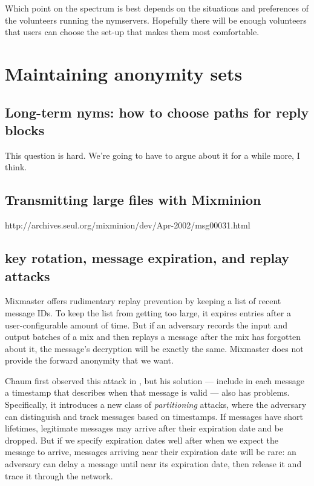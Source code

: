 \documentclass{llncs}
\begin{document}
{Which point on the spectrum is best depends on the situations and
preferences of the volunteers running the nymservers. Hopefully there
will be enough volunteers that users can choose the set-up that makes
them most comfortable.


\section{Maintaining anonymity sets}

\subsection{Long-term nyms: how to choose paths for reply blocks}

This question is hard. We're going to have to argue about it for a
while more, I think.

\subsection{Transmitting large files with Mixminion}

http://archives.seul.org/mixminion/dev/Apr-2002/msg00031.html

\subsection{key rotation, message expiration, and replay attacks}

Mixmaster offers rudimentary replay prevention by keeping a list of recent
message IDs. To keep the list from getting too large, it expires entries
after a user-configurable amount of time. But if an adversary records
the input and output batches of a mix and then replays a message after
the mix has forgotten about it, the message's decryption will be exactly
the same. Mixmaster does not provide the forward anonymity that we want.

Chaum first observed this attack in \cite{chaum-mix}, but his solution
--- include in each message a timestamp that describes when that message
is valid --- also has problems. Specifically, it introduces a new class
of \emph{partitioning} attacks, where the adversary can distinguish and
track messages based on timestamps. If messages have short lifetimes,
legitimate messages may arrive after their expiration date and be
dropped. But if we specify expiration dates well after when we expect the
message to arrive, messages arriving near their expiration date will be
rare: an adversary can delay a message until near its expiration date,
then release it and trace it through the network.

}
\end{document}
